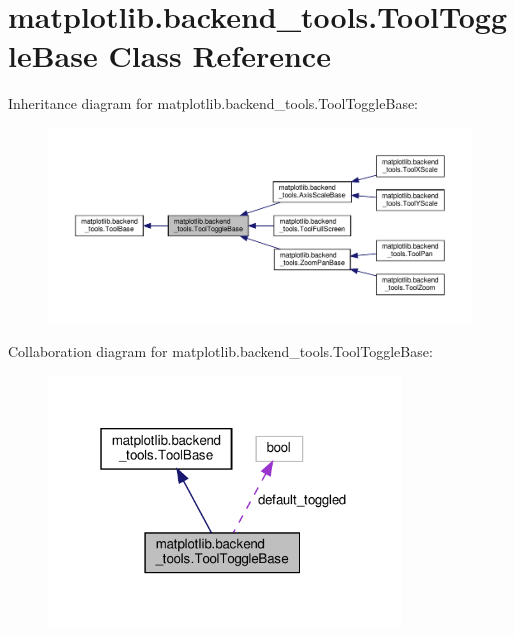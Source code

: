 \hypertarget{classmatplotlib_1_1backend__tools_1_1ToolToggleBase}{}\section{matplotlib.\+backend\+\_\+tools.\+Tool\+Toggle\+Base Class Reference}
\label{classmatplotlib_1_1backend__tools_1_1ToolToggleBase}


Inheritance diagram for matplotlib.\+backend\+\_\+tools.\+Tool\+Toggle\+Base\+:
\nopagebreak
\begin{figure}[H]
\begin{center}
\leavevmode
\includegraphics[width=350pt]{classmatplotlib_1_1backend__tools_1_1ToolToggleBase__inherit__graph}
\end{center}
\end{figure}


Collaboration diagram for matplotlib.\+backend\+\_\+tools.\+Tool\+Toggle\+Base\+:
\nopagebreak
\begin{figure}[H]
\begin{center}
\leavevmode
\includegraphics[width=265pt]{classmatplotlib_1_1backend__tools_1_1ToolToggleBase__coll__graph}
\end{center}
\end{figure}
